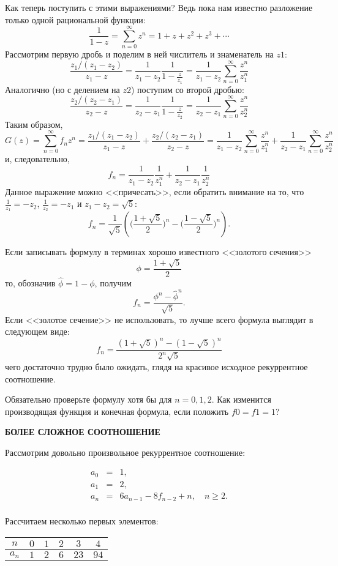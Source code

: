\documentclass[12pt, letterpaper]{extarticle}
\begin{document}
Как теперь поступить с этими выражениями? Ведь пока нам известно разложение только одной рациональной функции:
\[\frac{1}{1-z}=\sum_{n=0}^{\infty}z^n=1+z+z^2+z^3+\cdots\]
Рассмотрим первую дробь и поделим в ней числитель и знаменатель на $z1$:
\[\frac{z_1/(z_1-z_2)}{z_1-z}=\frac{1}{z_1-z_2}\frac{1}{1-\frac{z}{z_1}}=\frac{1}{z_1-z_2}\sum_{n=0}^{\infty}\frac{z^n}{z_1^n}\]
Аналогично (но с делением на $z2$) поступим со второй дробью:
\[\frac{z_2/(z_2-z_1)}{z_2-z}=\frac{1}{z_2-z_1}\frac{1}{1-\frac{z}{z_2}}=\frac{1}{z_2-z_1}\sum_{n=0}^{\infty}\frac{z^n}{z_2^n}\]
Таким образом,
\[G(z)=\sum_{n=0}^{\infty}f_nz^n=\frac{z_1/(z_1-z_2)}{z_1-z}+\frac{z_2/(z_2-z_1)}{z_2-z}=\frac{1}{z_1-z_2}\sum_{n=0}^{\infty}\frac{z^n}{z_1^n}+\frac{1}{z_2-z_1}\sum_{n=0}^{\infty}\frac{z^n}{z_2^n}\]
и, следовательно,
\[f_n=\frac{1}{z_1-z_2}\frac{1}{z_1^n}+\frac{1}{z_2-z_1}\frac{1}{z_2^n}\]
Данное выражение можно <<причесать>>, если обратить внимание на то, что $\frac{1}{z_1}=-z_2$, $\frac{1}{z_2}=-z_1$ и $z_1-z_2=\sqrt{5}$:
\[f_n=\frac{1}{\sqrt{5}}\left( \biggl( \frac{1+\sqrt{5}}{2} \biggr)^n - \biggl( \frac{1-\sqrt{5}}{2} \biggr)^n \right).\]

Если записывать формулу в терминах хорошо известного <<золотого сечения>>
\[\phi=\frac{1+\sqrt{5}}{2}\]
то, обозначив $\hat{\phi}=1-\phi$, получим
\[f_n= \frac{\phi^n - \hat\phi^n}{\sqrt{5}}.\]
Если <<золотое сечение>> не использовать, то лучше всего формула выглядит в следующем виде:
\[f_n = \frac{(1+\sqrt{5})^n - (1-\sqrt{5})^n}{2^n\sqrt{5}}\]
чего достаточно трудно было ожидать, глядя на красивое исходное рекуррентное соотношение.

Обязательно проверьте формулу хотя бы для $n=0, 1, 2$. Как изменится производящая функция и конечная формула, если положить $f0=f1=1$?
\begin{center}
  \textbf{БОЛЕЕ СЛОЖНОЕ СООТНОШЕНИЕ}
\end{center}

Рассмотрим довольно произвольное рекуррентное соотношение:

\[\begin{array}{rcl}
a_0&{}={}&1,\\
a_1&{}={}&2,\\
a_n&{}={}&6a_{n-1}-8f_{n-2}+n, \quad n\geq2.\\
\end{array}\]

Рассчитаем несколько первых элементов:

\begin{center}\begin{tabular}{| c | c | c | c | c | c |}
  \hline
  $n$ & $0$ & $1$ & $2$ & $3$ & $4$ \\
  \hline
  $a_n$ & $1$ & $2$ & $6$ & $23$ & $94$ \\
  \hline
\end{tabular}\end{center}
\end{document}

